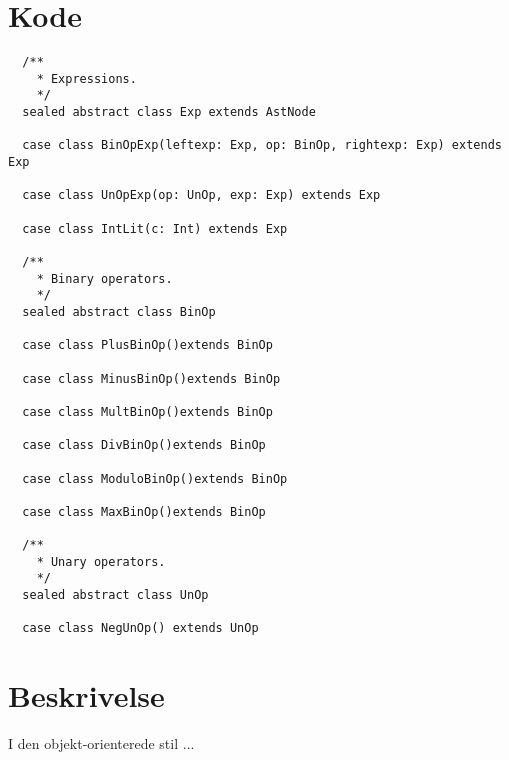 \documentclass[a4paper, 10pt]{article}
\begin{document}
\section*{Kode}
\begin{lstlisting}
  /**
    * Expressions.
    */
  sealed abstract class Exp extends AstNode

  case class BinOpExp(leftexp: Exp, op: BinOp, rightexp: Exp) extends Exp

  case class UnOpExp(op: UnOp, exp: Exp) extends Exp

  case class IntLit(c: Int) extends Exp

  /**
    * Binary operators.
    */
  sealed abstract class BinOp

  case class PlusBinOp()extends BinOp

  case class MinusBinOp()extends BinOp

  case class MultBinOp()extends BinOp

  case class DivBinOp()extends BinOp

  case class ModuloBinOp()extends BinOp

  case class MaxBinOp()extends BinOp

  /**
    * Unary operators.
    */
  sealed abstract class UnOp

  case class NegUnOp() extends UnOp
\end{lstlisting}
\section*{Beskrivelse}
I den objekt-orienterede stil ...
\end{document}
